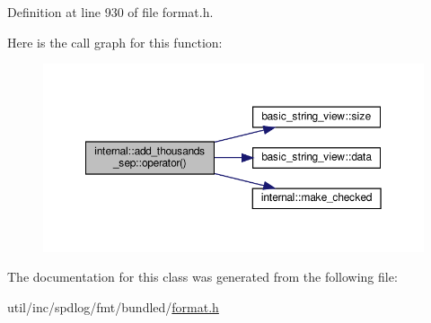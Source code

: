 Definition at line 930 of file format.\+h.

Here is the call graph for this function\+:
\nopagebreak
\begin{figure}[H]
\begin{center}
\leavevmode
\includegraphics[width=350pt]{classinternal_1_1add__thousands__sep_a5a5f664cc8edbaccf37fbb1399366c5e_cgraph}
\end{center}
\end{figure}


The documentation for this class was generated from the following file\+:\begin{DoxyCompactItemize}
\item 
util/inc/spdlog/fmt/bundled/\hyperlink{format_8h}{format.\+h}\end{DoxyCompactItemize}

